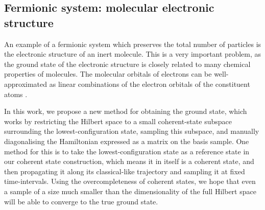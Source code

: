 \subsection{Fermionic system: molecular electronic structure} \label{sec:fermionic1}
An example of a fermionic system which preserves the total number of particles is the electronic structure of an inert molecule. This is a very important problem, as the ground state of the electronic structure is closely related to many chemical properties of molecules. The molecular orbitals of electrons can be well-approximated as linear combinations of the electron orbitals of the constituent atoms \cite{mulliken}.

In this work, we propose a new method for obtaining the ground state, which works by restricting the Hilbert space to a small coherent-state subspace surrounding the lowest-configuration state, sampling this subspace, and manually diagonalising the Hamiltonian expressed as a matrix on the basis sample. One method for this is to take the lowest-configuration state as a reference state in our coherent state construction, which means it in itself is a coherent state, and then propagating it along its classical-like trajectory and sampling it at fixed time-intervals. Using the overcompleteness of coherent states, we hope that even a sample of a size much smaller than the dimensionality of the full Hilbert space will be able to converge to the true ground state.
